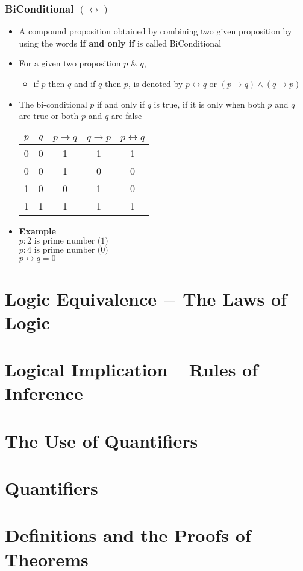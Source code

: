 \documentclass{article}
\begin{document}
	\subsubsection{BiConditional $(\leftrightarrow)$}
	\begin{itemize}
		\item A compound proposition obtained by combining two given proposition by using the words
			\textbf{if and only if} is called BiConditional
		\item For a given two proposition $p$ \& $q$,
			\begin{itemize}
				\item if $p$ then $q$ and if $q$ then $p$, is denoted by $p\leftrightarrow q$
					or $(p\to q)\land(q\to p)$
			\end{itemize}
		\item The bi-conditional $p$ if and only if $q$ is true, if it is only when both $p$ and $q$
			are true or both $p$ and $q$ are false
			\begin{center}
				\begin{tabular}{|c|c|c|c|c|} \hline
					$p$ & $q$ & $p\to q$ & $q\to p$ & $p\leftrightarrow q$ \\ \hline
					0 & 0 & 1 & 1 & 1 \\
					0 & 0 & 1 & 0 & 0 \\
					1 & 0 & 0 & 1 & 0 \\
					1 & 1 & 1 & 1 & 1 \\ \hline
				\end{tabular}
			\end{center}
		\item \textbf{Example} \\
			$p : \text{2 is prime number (1)}$ \\
			$p : \text{4 is prime number (0)}$ \\
			$p\leftrightarrow q=0$
	\end{itemize}

	\section{Logic Equivalence $-$ The Laws of Logic}

	\section{Logical Implication $–$ Rules of Inference}

	\section{The Use of Quantifiers}
	\section{Quantifiers}
	\section{Definitions and the Proofs of Theorems}
\end{document}
